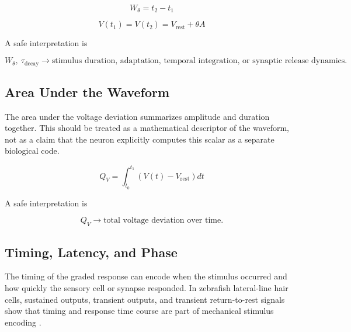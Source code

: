 \documentclass[a4paper]{article}
\begin{document}
            \begin{equation}
                W_{\theta}
                =
                t_2-t_1
            \end{equation}
            
            \begin{equation}
                V(t_1)
                =
                V(t_2)
                =
                V_{\mathrm{rest}}+\theta A
            \end{equation}
            
            A safe interpretation is
            
            \begin{equation}
                W_{\theta},\ \tau_{\mathrm{decay}}
                \rightarrow
                \text{stimulus duration, adaptation, temporal integration, or synaptic release dynamics}.
            \end{equation}
        
        \subsection{Area Under the Waveform}
            
            The area under the voltage deviation summarizes amplitude and duration together. This should be treated as a mathematical descriptor of the waveform, not as a claim that the neuron explicitly computes this scalar as a separate biological code.
            
            \begin{equation}
                Q_V
                =
                \int_{t_0}^{t_1}
                \left(V(t)-V_{\mathrm{rest}}\right)
                dt
            \end{equation}
            
            A safe interpretation is
            
            \begin{equation}
                Q_V
                \rightarrow
                \text{total voltage deviation over time}.
            \end{equation}
        
        \subsection{Timing, Latency, and Phase}
            
            The timing of the graded response can encode when the stimulus occurred and how quickly the sensory cell or synapse responded. In zebrafish lateral-line hair cells, sustained outputs, transient outputs, and transient return-to-rest signals show that timing and response time course are part of mechanical stimulus encoding \citep{pichler-2019-the-transfer-characteristics-of-hair-cells-encoding-mechanical-stimuli-in-the-lateral-line-of-zebrafish}.
            
\end{document}
